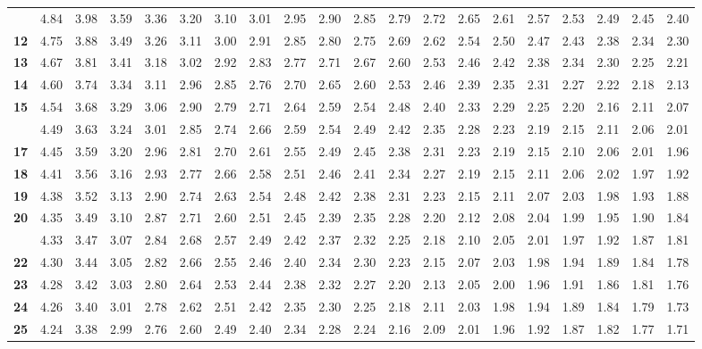 \documentclass[]{article}
\begin{document}
\begin{landscape}
\begin{longtable}{>{\bfseries}r|rrrrrrrrrrrrrrrrrrr}
\addlinespace
11 & 4.84 & 3.98 & 3.59 & 3.36 & 3.20 & 3.10 & 3.01 & 2.95 & 2.90 & 2.85 & 2.79 & 2.72 & 2.65 & 2.61 & 2.57 & 2.53 & 2.49 & 2.45 & 2.40\\
12 & 4.75 & 3.88 & 3.49 & 3.26 & 3.11 & 3.00 & 2.91 & 2.85 & 2.80 & 2.75 & 2.69 & 2.62 & 2.54 & 2.50 & 2.47 & 2.43 & 2.38 & 2.34 & 2.30\\
13 & 4.67 & 3.81 & 3.41 & 3.18 & 3.02 & 2.92 & 2.83 & 2.77 & 2.71 & 2.67 & 2.60 & 2.53 & 2.46 & 2.42 & 2.38 & 2.34 & 2.30 & 2.25 & 2.21\\
14 & 4.60 & 3.74 & 3.34 & 3.11 & 2.96 & 2.85 & 2.76 & 2.70 & 2.65 & 2.60 & 2.53 & 2.46 & 2.39 & 2.35 & 2.31 & 2.27 & 2.22 & 2.18 & 2.13\\
15 & 4.54 & 3.68 & 3.29 & 3.06 & 2.90 & 2.79 & 2.71 & 2.64 & 2.59 & 2.54 & 2.48 & 2.40 & 2.33 & 2.29 & 2.25 & 2.20 & 2.16 & 2.11 & 2.07\\
\addlinespace
16 & 4.49 & 3.63 & 3.24 & 3.01 & 2.85 & 2.74 & 2.66 & 2.59 & 2.54 & 2.49 & 2.42 & 2.35 & 2.28 & 2.23 & 2.19 & 2.15 & 2.11 & 2.06 & 2.01\\
17 & 4.45 & 3.59 & 3.20 & 2.96 & 2.81 & 2.70 & 2.61 & 2.55 & 2.49 & 2.45 & 2.38 & 2.31 & 2.23 & 2.19 & 2.15 & 2.10 & 2.06 & 2.01 & 1.96\\
18 & 4.41 & 3.56 & 3.16 & 2.93 & 2.77 & 2.66 & 2.58 & 2.51 & 2.46 & 2.41 & 2.34 & 2.27 & 2.19 & 2.15 & 2.11 & 2.06 & 2.02 & 1.97 & 1.92\\
19 & 4.38 & 3.52 & 3.13 & 2.90 & 2.74 & 2.63 & 2.54 & 2.48 & 2.42 & 2.38 & 2.31 & 2.23 & 2.15 & 2.11 & 2.07 & 2.03 & 1.98 & 1.93 & 1.88\\
20 & 4.35 & 3.49 & 3.10 & 2.87 & 2.71 & 2.60 & 2.51 & 2.45 & 2.39 & 2.35 & 2.28 & 2.20 & 2.12 & 2.08 & 2.04 & 1.99 & 1.95 & 1.90 & 1.84\\
\addlinespace
21 & 4.33 & 3.47 & 3.07 & 2.84 & 2.68 & 2.57 & 2.49 & 2.42 & 2.37 & 2.32 & 2.25 & 2.18 & 2.10 & 2.05 & 2.01 & 1.97 & 1.92 & 1.87 & 1.81\\
22 & 4.30 & 3.44 & 3.05 & 2.82 & 2.66 & 2.55 & 2.46 & 2.40 & 2.34 & 2.30 & 2.23 & 2.15 & 2.07 & 2.03 & 1.98 & 1.94 & 1.89 & 1.84 & 1.78\\
23 & 4.28 & 3.42 & 3.03 & 2.80 & 2.64 & 2.53 & 2.44 & 2.38 & 2.32 & 2.27 & 2.20 & 2.13 & 2.05 & 2.00 & 1.96 & 1.91 & 1.86 & 1.81 & 1.76\\
24 & 4.26 & 3.40 & 3.01 & 2.78 & 2.62 & 2.51 & 2.42 & 2.35 & 2.30 & 2.25 & 2.18 & 2.11 & 2.03 & 1.98 & 1.94 & 1.89 & 1.84 & 1.79 & 1.73\\
25 & 4.24 & 3.38 & 2.99 & 2.76 & 2.60 & 2.49 & 2.40 & 2.34 & 2.28 & 2.24 & 2.16 & 2.09 & 2.01 & 1.96 & 1.92 & 1.87 & 1.82 & 1.77 & 1.71\\

\end{longtable}
\end{landscape}
\end{document}
